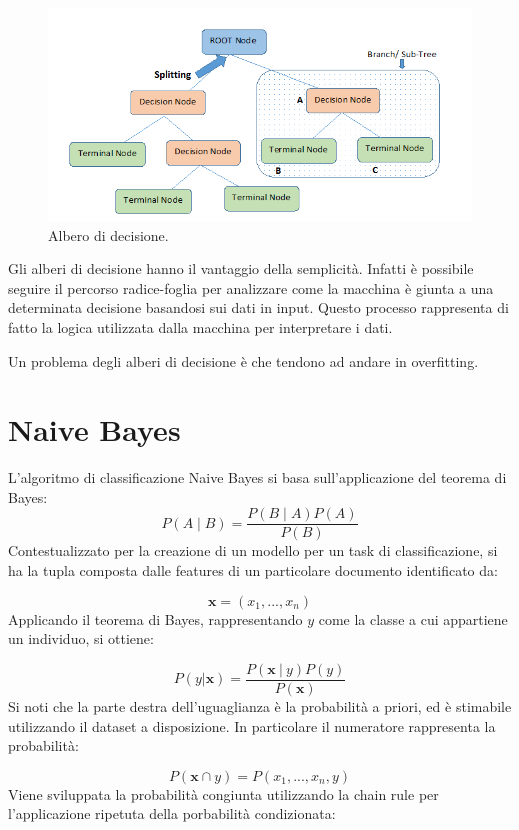 \documentclass[oneside]{book}
\begin{document}
\begin{figure}[!h]
	\centering
	\includegraphics[width=13cm]{assets/decision_tree.png}
	\caption[Caption for LOF]{Albero di decisione.\footnotemark}
	\label{fig:decision-tree}
\end{figure}




Gli alberi di decisione hanno il vantaggio della semplicità. Infatti è possibile seguire il percorso radice-foglia per analizzare come la macchina è giunta a una determinata decisione basandosi sui dati in input. Questo processo rappresenta di fatto la logica utilizzata dalla macchina per interpretare i dati.

Un problema degli alberi di decisione è che tendono ad andare in overfitting.

\newpage
\section{Naive Bayes}
L'algoritmo di classificazione Naive Bayes si basa sull'applicazione del teorema di Bayes:
$$P(A \mid B) = \frac{P(B \mid A)P(A)}{P(B)}$$
Contestualizzato per la creazione di un modello per un task di classificazione, si ha la tupla composta dalle features di un particolare documento identificato da:

$$\textbf{x} = (x_1, ..., x_n)$$
Applicando il teorema di Bayes, rappresentando $y$ come la classe a cui appartiene un individuo, si ottiene:

$$P(y|\textbf{x}) =
\frac{P(\textbf{x}\ |\ y)P(y)}{P(\textbf{x})}$$
Si noti che la parte destra dell'uguaglianza è la probabilità a priori, ed è stimabile utilizzando il dataset a disposizione. In particolare il numeratore rappresenta la probabilità:

$$P(\textbf{x} \cap y) = P(x_1, ..., x_n, y)$$
Viene sviluppata la probabilità congiunta utilizzando la chain rule per l'applicazione ripetuta della porbabilità condizionata:
\end{document}
